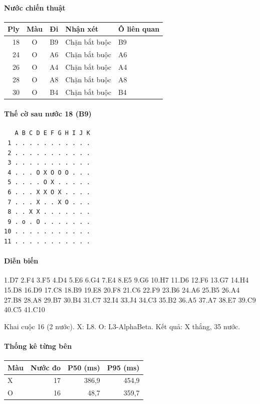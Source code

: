\paragraph{Nước chiến thuật}
\begin{center}\small
\begin{tabular}{@{}rccll@{}}
\toprule
Ply & Màu & Đi & Nhận xét & Ô liên quan \\
\midrule
18 & O & B9 & Chặn bắt buộc & B9 \\
24 & O & A6 & Chặn bắt buộc & A6 \\
26 & O & A4 & Chặn bắt buộc & A4 \\
28 & O & A8 & Chặn bắt buộc & A8 \\
30 & O & B4 & Chặn bắt buộc & B4 \\
\bottomrule
\end{tabular}
\end{center}
\paragraph{Thế cờ sau nước 18 (B9)}
\begin{verbatim}
   A B C D E F G H I J K
 1 . . . . . . . . . . .
 2 . . . . . . . . . . .
 3 . . . . . . . . . . .
 4 . . . O X O O O . . .
 5 . . . . O X . . . . .
 6 . . . X X O X . . . .
 7 . . . X . . X O . . .
 8 . . X X . . . . . . .
 9 . o . O . . . . . . .
10 . . . . . . . . . . .
11 . . . . . . . . . . .
\end{verbatim}
\paragraph{Diễn biến}
{\footnotesize 1.D7 2.F4 3.F5 4.D4 5.E6 6.G4 7.E4 8.E5 9.G6 10.H7 11.D6 12.F6 13.G7 14.H4 15.D8 16.D9 17.C8 18.B9 19.E8 20.F8 21.C6 22.F9 23.B6 24.A6 25.B5 26.A4 27.B8 28.A8 29.B7 30.B4 31.C7 32.I4 33.J4 34.C3 35.B2 36.A5 37.A7 38.E7 39.C9 40.C5 41.C10\par}
Khai cuộc 16 (2 nước). X: L8. O: L3-AlphaBeta. Kết quả: X thắng, 35 nước.
\paragraph{Thống kê từng bên}
\begin{center}\small
\begin{tabular}{@{}lrrr@{}}
\toprule
Màu & Nước đo & P50 (ms) & P95 (ms) \\
\midrule
X & 17 & 386,9 & 454,9 \\
O & 16 & 48,7 & 359,7 \\
\bottomrule
\end{tabular}
\end{center}
